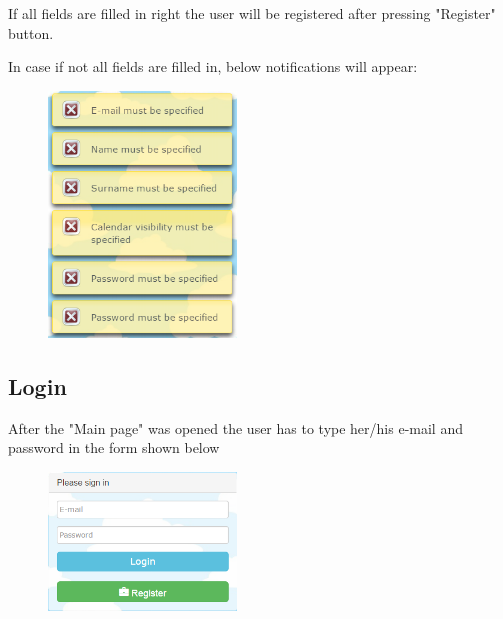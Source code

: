 \par If all fields are filled in right the user will be registered after pressing "Register" button.
\par In case if not all fields are filled in, below notifications will appear:
        \begin{figure}[tbh]
         \begin{center}
          \includegraphics[width=50mm]{reger1}
         \end{center}
        \end{figure}

\newpage
\subsection{Login}
\par \qquad After the "Main page" was opened the user has to type her/his e-mail and password in the form shown below
\begin{figure}[tbh]
  \begin{center}
    \includegraphics[width=50mm]{login}
  \end{center}
\end{figure}

